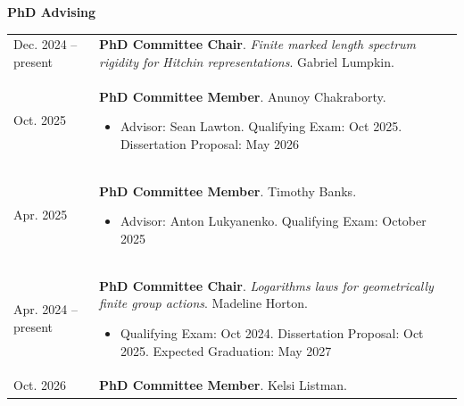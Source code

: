 
    \medskip


    \medskip
    \medskip



    \textbf{\large PhD Advising}
    
    \begin{center}
    {
    \renewcommand{\arraystretch}{1.5}
    \begin{longtable}{p{}  p{}}
     Dec.  2024 --    present & \textbf{PhD Committee Chair}. \textit{Finite marked length spectrum rigidity for Hitchin representations}.  Gabriel Lumpkin.  \\ 
 Oct.  2025 & \textbf{PhD Committee Member}.  Anunoy Chakraborty. 
        \hspace{-1em}

        {\small
        \begin{itemize}
        \setlength{\parindent}{0em}
        \item[] Advisor: Sean Lawton. Qualifying Exam: Oct 2025. Dissertation Proposal: May 2026
        \end{itemize}
        }
        \vspace{-1em}
         \\ 
 Apr.  2025 & \textbf{PhD Committee Member}.  Timothy Banks. 
        \hspace{-1em}

        {\small
        \begin{itemize}
        \setlength{\parindent}{0em}
        \item[] Advisor: Anton Lukyanenko. Qualifying Exam: October 2025
        \end{itemize}
        }
        \vspace{-1em}
         \\ 
 Apr.  2024 --    present & \textbf{PhD Committee Chair}. \textit{Logarithms laws for geometrically finite group actions}.  Madeline Horton. 
        \hspace{-1em}

        {\small
        \begin{itemize}
        \setlength{\parindent}{0em}
        \item[] Qualifying Exam: Oct 2024. Dissertation Proposal: Oct 2025. Expected Graduation: May 2027
        \end{itemize}
        }
        \vspace{-1em}
         \\ 
 Oct.  2026 & \textbf{PhD Committee Member}.  Kelsi Listman. 
        \hspace{-1em}


\end{longtable}}
\end{center}
